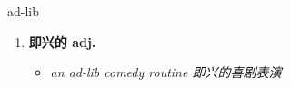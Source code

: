 
\begin{frame}
{\huge ad-lib}
\begin{center}
\begin{enumerate}\Large
  \item \textbf{即兴的 adj.}
  \begin{itemize}
    \item \em{\Large{an ad-lib comedy routine 即兴的喜剧表演}}
  \end{itemize}
\end{enumerate}
\end{center}
\end{frame}
